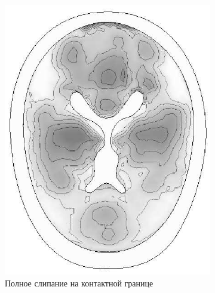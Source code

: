 \begin{figure}[h]
\centering
\begin{subfigure}[b]{0.3\textwidth}
\centering
\includegraphics[width=\textwidth]{png/cranium/2d-problem-res-4.png}
\caption{Полное слипание на контактной границе}
\end{subfigure}
\begin{subfigure}[b]{0.3\textwidth}
\centering

\end{subfigure}
\end{figure}

